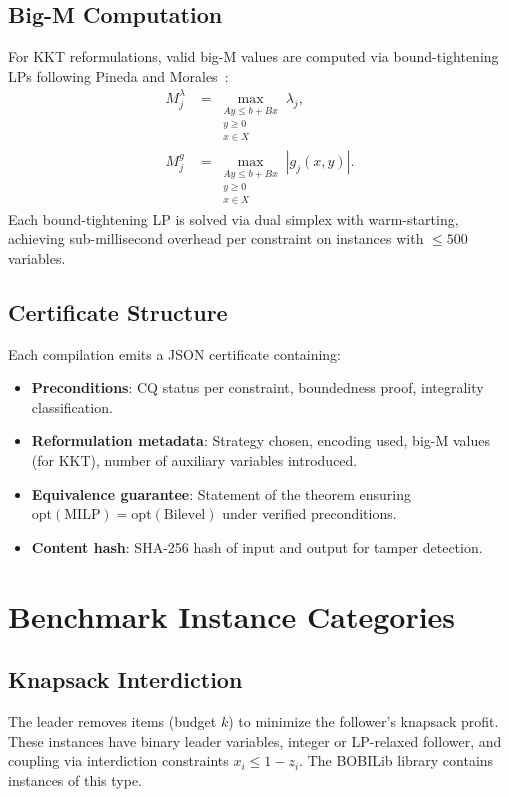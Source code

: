 \documentclass[11pt]{article}
\newcommand{\opt}{\mathrm{opt}}
\begin{document}
\subsection{Big-M Computation}

For KKT reformulations, valid big-M values are computed via
bound-tightening LPs following Pineda and Morales~\cite{pineda2019solving}:
\begin{align}
M_j^{\lambda} &= \max_{\substack{Ay \leq b + Bx \\ y \geq 0 \\ x \in X}} \lambda_j, \\
M_j^{g} &= \max_{\substack{Ay \leq b + Bx \\ y \geq 0 \\ x \in X}} |g_j(x,y)|.
\end{align}
Each bound-tightening LP is solved via dual simplex with warm-starting,
achieving sub-millisecond overhead per constraint on instances with
$\leq 500$ variables.

\subsection{Certificate Structure}

Each compilation emits a JSON certificate containing:
\begin{itemize}
\item \textbf{Preconditions}: CQ status per constraint, boundedness proof,
  integrality classification.
\item \textbf{Reformulation metadata}: Strategy chosen, encoding used,
  big-M values (for KKT), number of auxiliary variables introduced.
\item \textbf{Equivalence guarantee}: Statement of the theorem ensuring
  $\opt(\text{MILP}) = \opt(\text{Bilevel})$ under verified preconditions.
\item \textbf{Content hash}: SHA-256 hash of input and output for tamper
  detection.
\end{itemize}

\section{Benchmark Instance Categories}
\label{sec:instances}

\subsection{Knapsack Interdiction}
The leader removes items (budget $k$) to minimize the follower's knapsack
profit. These instances have binary leader variables, integer or LP-relaxed
follower, and coupling via interdiction constraints $x_i \leq 1 - z_i$.
The BOBILib library contains instances of this type.
\end{document}
